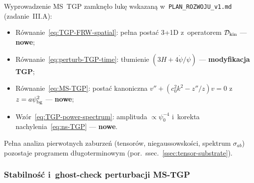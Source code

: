\begin{remark}\label{rem:IIIa-status}
Wyprowadzenie MS~TGP zamknęło lukę wskazaną
w~\texttt{PLAN\_ROZWOJU\_v1.md} (zadanie~III.A):
\begin{itemize}[nosep]
  \item R\'ownanie~\eqref{eq:TGP-FRW-spatial}:
    pe\l{}na postać 3+1D z~operatorem $\mathcal{D}_{\rm kin}$ --- \textbf{nowe};
  \item R\'ownanie~\eqref{eq:perturb-TGP-time}:
    t\l{}umienie $(3H + 4\dot\psi/\psi)$ --- \textbf{modyfikacja TGP};
  \item R\'ownanie~\eqref{eq:MS-TGP}: posta\'c kanoniczna $v''+(c_0^2k^2-z''/z)v=0$
    z~$z = a\psi_{\rm bg}^2$ --- \textbf{nowe};
  \item Wzór~\eqref{eq:TGP-power-spectrum}: amplituda $\propto \psi_0^{-4}$
    i~korekta nachylenia~\eqref{eq:ns-TGP} --- \textbf{nowe}.
\end{itemize}
Pe\l{}na analiza pierwotnych zaburze\'n (tensor\'ow, niega\-ussow\-sko\'sci,
spektrum $\sigma_{ab}$) pozostaje programem d\l{}ugoterminowym
(por.~ssec.~\ref{ssec:tensor-substrate}).
\end{remark}

\subsubsection{Stabilno\'s\'c i~ghost-check perturbacji MS-TGP}\label{sssec:ghost-check}

